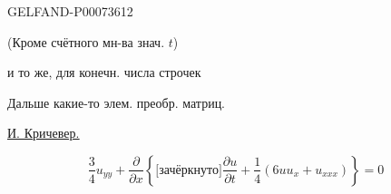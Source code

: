 \begin{GelfandAdjacentEvidence}{GELFAND-P000736}{12}

(Кроме счётного мн-ва знач. \(t\))

и то же, для конечн. числа строчек

Дальше какие-то элем. преобр. матриц.

\underline{\underline{И. Кричевер.}}

\begin{equation*}
\tag*{(1)\hfill}
\frac34 u_{yy}+\frac{\partial}{\partial x}
\left\{\text{[зачёркнуто]}\frac{\partial u}{\partial t}
+\frac14(6uu_x+u_{xxx})\right\}=0
\end{equation*}
\end{GelfandAdjacentEvidence}



